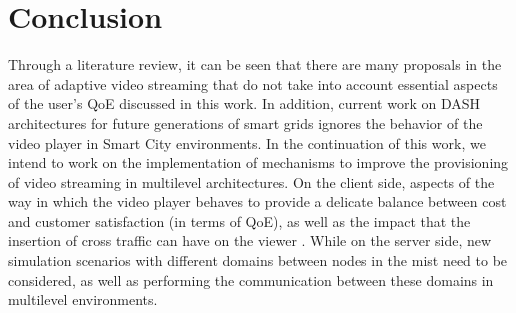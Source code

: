 \section{Conclusion}
\label{sec:conclusion}

Through a literature review, it can be seen that there are many proposals in the area of ​​adaptive video streaming that do not take into account essential aspects of the user's QoE discussed in this work. In addition, current work on DASH architectures for future generations of smart grids ignores the behavior of the video player in Smart City environments. In the continuation of this work, we intend to work on the implementation of mechanisms to improve the provisioning of video streaming in multilevel architectures. On the client side, aspects of the way in which the video player behaves to provide a delicate balance between cost and customer satisfaction (in terms of QoE), as well as the impact that the insertion of cross traffic can have on the viewer . While on the server side, new simulation scenarios with different domains between nodes in the mist need to be considered, as well as performing the communication between these domains in multilevel environments.